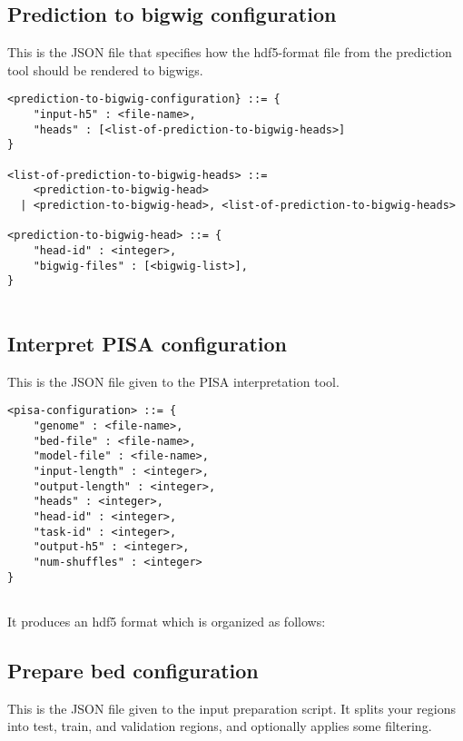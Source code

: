 \documentclass{article}
\begin{document}
\subsection{Prediction to bigwig configuration}
This is the JSON file that specifies how the hdf5-format file from the prediction tool should be rendered to bigwigs. 

\begin{lstlisting}
<prediction-to-bigwig-configuration} ::= {
    "input-h5" : <file-name>,
    "heads" : [<list-of-prediction-to-bigwig-heads>]
}

<list-of-prediction-to-bigwig-heads> ::=
    <prediction-to-bigwig-head>
  | <prediction-to-bigwig-head>, <list-of-prediction-to-bigwig-heads>

<prediction-to-bigwig-head> ::= {
    "head-id" : <integer>,
    "bigwig-files" : [<bigwig-list>],
}


\end{lstlisting}



\subsection{Interpret PISA configuration}

This is the JSON file given to the PISA interpretation tool. 
\begin{lstlisting}
<pisa-configuration> ::= {
    "genome" : <file-name>,
    "bed-file" : <file-name>,
    "model-file" : <file-name>,
    "input-length" : <integer>,
    "output-length" : <integer>,
    "heads" : <integer>,
    "head-id" : <integer>,
    "task-id" : <integer>,
    "output-h5" : <integer>,
    "num-shuffles" : <integer>
}


\end{lstlisting}



It produces an hdf5 format which is organized as follows:




\subsection{Prepare bed configuration}
This is the JSON file given to the input preparation script. It splits your regions into 
test, train, and validation regions, and optionally applies some filtering. 
\end{document}
